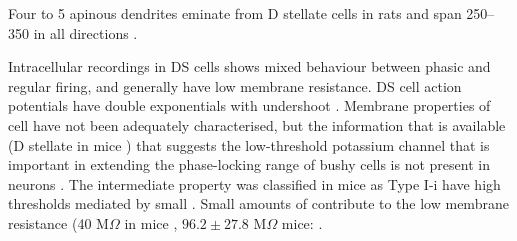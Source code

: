

Four to 5 apinous dendrites eminate from D stellate cells in rats and span 250--350 \um in all directions \citep{DoucetRyugo:1997}.

Intracellular recordings in DS cells shows mixed behaviour between phasic and
regular firing, and generally have low membrane resistance.  DS cell action
potentials have double exponentials with undershoot
\citep{PaoliniClark:1999,WuOertel:1984}.  Membrane properties of \OnC cell have
not been adequately characterised, but the information that is available (D
stellate in mice \citealt{OertelWuEtAl:1990}) that suggests the low-threshold
potassium channel that is important in extending the phase-locking range of
bushy cells \citep{ManisMarx:1991,Oertel:1983} is not present in \OnC neurons
\citep{WhiteYoungEtAl:1994}.  The intermediate property was classified in mice
as Type I-i have high thresholds mediated by small \IKLT
\citep{RothmanManis:2003b}.
Small amounts of \IKLT contribute to the low membrane resistance (40 M$\Omega$ in mice \citealt{OertelWuEtAl:1990},  $96.2 \pm 27.8$ M$\Omega$ mice: \citealt{FerragamoGoldingEtAl:1998a}.




